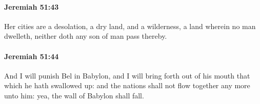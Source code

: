 		\paragraph{Jeremiah 51:43} %
			\label{JEREMIAH-51-43}

			Her cities are a desolation, a dry land, and a wilderness, a land wherein no man dwelleth, neither doth any son of man pass thereby.


		\paragraph{Jeremiah 51:44} %
			\label{JEREMIAH-51-44}

			And I will punish Bel in Babylon, and I will bring forth out of his mouth that which he hath swallowed up: and the nations shall not flow together any more unto him: yea, the wall of Babylon shall fall.



